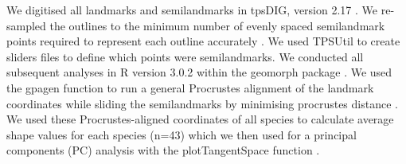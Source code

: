 \documentclass[12pt,a4paper]{article}
\begin{document}
	

	We digitised all landmarks and semilandmarks in tpsDIG, version 2.17 \citep{Rohlf2013}. We re-sampled the outlines to the minimum number of evenly spaced semilandmark points required to represent each outline accurately \citep[][details in supplementary material]{MacLeod2013}. We used TPSUtil \citep{Rohlf2012} to create sliders files \citep{Zelditch2012} to define which points were semilandmarks. We conducted all subsequent analyses in R version 3.0.2 \citep{Team2014} within the geomorph package \citep{Adams2013}. We used the gpagen function to run a general Procrustes alignment \citep{Rohlf1993} of the landmark coordinates while sliding the semilandmarks by minimising procrustes distance \citep{Bookstein1997}. We used these Procrustes-aligned coordinates of all species to calculate average shape values for each species (n=43) which we then used for a principal components (PC) analysis with the plotTangentSpace function \citep{Adams2013}. 

\end{document}
